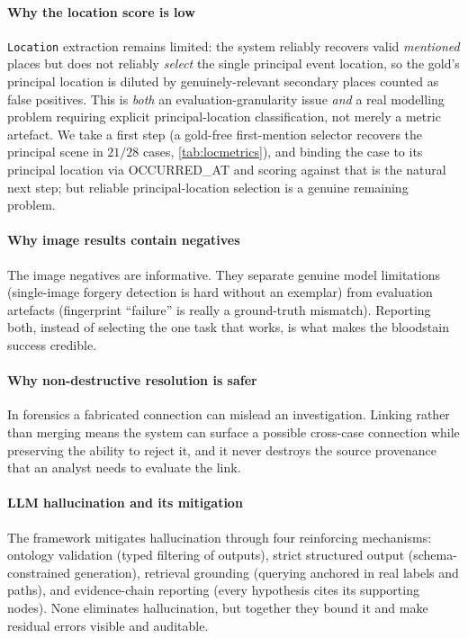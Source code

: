 \documentclass[conference]{IEEEtran}
\newcommand{\rel}[1]{\textup{\MakeUppercase{#1}}}
\newcommand{\node}[1]{\texttt{#1}}
\begin{document}
\paragraph*{Why the location score is low} \node{Location} extraction remains
limited: the system reliably recovers valid \emph{mentioned} places but does not
reliably \emph{select} the single principal event location, so the gold's principal
location is diluted by genuinely-relevant secondary places counted as false
positives. This is \emph{both} an evaluation-granularity issue \emph{and} a real
modelling problem requiring explicit principal-location classification, not merely
a metric artefact. We take a first step (a gold-free first-mention selector recovers
the principal scene in $21/28$ cases, \cref{tab:locmetrics}), and binding the case
to its principal location via \rel{occurred\_at} and scoring against that is the
natural next step; but reliable principal-location selection is a genuine remaining
problem.

\paragraph*{Why image results contain negatives} The image negatives are
informative. They separate genuine model limitations (single-image forgery
detection is hard without an exemplar) from evaluation artefacts (fingerprint
``failure'' is really a ground-truth mismatch). Reporting both, instead of
selecting the one task that works, is what makes the bloodstain success
credible.

\paragraph*{Why non-destructive resolution is safer} In forensics a fabricated
connection can mislead an investigation. Linking rather than merging means the
system can surface a possible cross-case connection while preserving the ability
to reject it, and it never destroys the source provenance that an analyst needs
to evaluate the link.

\paragraph*{LLM hallucination and its mitigation} The framework mitigates
hallucination through four reinforcing mechanisms: ontology validation (typed
filtering of outputs), strict structured output (schema-constrained generation),
retrieval grounding (querying anchored in real labels and paths), and
evidence-chain reporting (every hypothesis cites its supporting nodes). None
eliminates hallucination, but together they bound it and make residual errors
visible and auditable.
\end{document}
